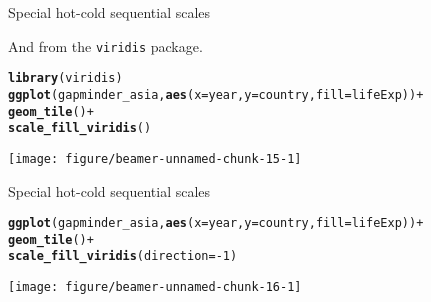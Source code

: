 \documentclass[table]{beamer}\usepackage[]{graphicx}\usepackage[]{color}
\makeatletter
\def\maxwidth{ %
  \ifdim\Gin@nat@width>\linewidth
    \linewidth
  \else
    \Gin@nat@width
  \fi
}
\newcommand{\hlnum}[1]{\textcolor[rgb]{0.686,0.059,0.569}{#1}}%
\newcommand{\hlopt}[1]{\textcolor[rgb]{0,0,0}{#1}}%
\newcommand{\hlstd}[1]{\textcolor[rgb]{0.345,0.345,0.345}{#1}}%
\newcommand{\hlkwc}[1]{\textcolor[rgb]{0.333,0.667,0.333}{#1}}%
\newcommand{\hlkwd}[1]{\textcolor[rgb]{0.737,0.353,0.396}{\textbf{#1}}}%
\newenvironment{kframe}{%
 \def\at@end@of@kframe{}%
 \ifinner\ifhmode%
  \def\at@end@of@kframe{\end{minipage}}%
  \begin{minipage}{\columnwidth}%
 \fi\fi%
 \def\FrameCommand##1{\hskip\@totalleftmargin \hskip-\fboxsep
 \colorbox{shadecolor}{##1}\hskip-\fboxsep
     \hskip-\linewidth \hskip-\@totalleftmargin \hskip\columnwidth}%
 \MakeFramed {\advance\hsize-\width
   \@totalleftmargin\z@ \linewidth\hsize
   \@setminipage}}%
 {\par\unskip\endMakeFramed%
 \at@end@of@kframe}
\newenvironment{knitrout}{}{} %
\makeatother
\begin{document}

\begin{frame}[fragile]{Special hot-cold sequential scales}

And from the {\tt viridis} package.

\begin{knitrout}\tiny
{}\color{fgcolor}\begin{kframe}
\begin{alltt}
\hlkwd{library}\hlstd{(viridis)}
\hlkwd{ggplot}\hlstd{(gapminder_asia,} \hlkwd{aes}\hlstd{(}\hlkwc{x}\hlstd{=year,} \hlkwc{y}\hlstd{=country,} \hlkwc{fill}\hlstd{=lifeExp))} \hlopt{+}
    \hlkwd{geom_tile}\hlstd{()} \hlopt{+}
    \hlkwd{scale_fill_viridis}\hlstd{()}
\end{alltt}
\end{kframe}

{\centering \texttt{[image: figure/beamer-unnamed-chunk-15-1]} 

}


\end{knitrout}

\end{frame}


\begin{frame}[fragile]{Special hot-cold sequential scales}

\begin{knitrout}\tiny
{}\color{fgcolor}\begin{kframe}
\begin{alltt}
\hlkwd{ggplot}\hlstd{(gapminder_asia,} \hlkwd{aes}\hlstd{(}\hlkwc{x}\hlstd{=year,} \hlkwc{y}\hlstd{=country,} \hlkwc{fill}\hlstd{=lifeExp))} \hlopt{+}
    \hlkwd{geom_tile}\hlstd{()} \hlopt{+}
    \hlkwd{scale_fill_viridis}\hlstd{(}\hlkwc{direction}\hlstd{=}\hlopt{-}\hlnum{1}\hlstd{)}
\end{alltt}
\end{kframe}

{\centering \texttt{[image: figure/beamer-unnamed-chunk-16-1]} 

}


\end{knitrout}

\end{frame}


\end{document}
